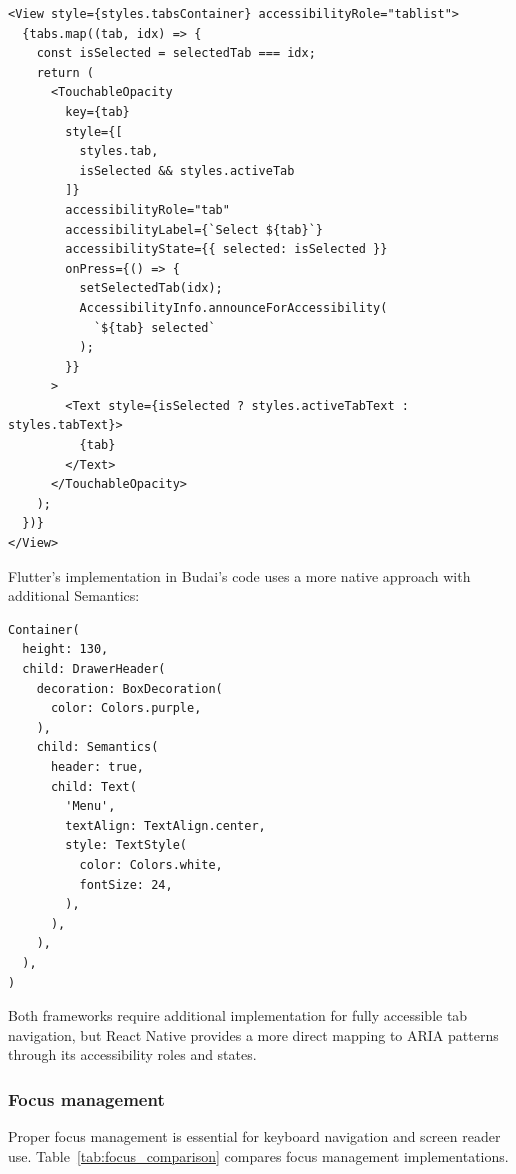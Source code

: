 \begin{lstlisting}[style=ReactNativeStyle, caption=React Native tab navigation implementation, label=lst:rn-tab]
<View style={styles.tabsContainer} accessibilityRole="tablist">
  {tabs.map((tab, idx) => {
    const isSelected = selectedTab === idx;
    return (
      <TouchableOpacity
        key={tab}
        style={[
          styles.tab,
          isSelected && styles.activeTab
        ]}
        accessibilityRole="tab"
        accessibilityLabel={`Select ${tab}`}
        accessibilityState={{ selected: isSelected }}
        onPress={() => {
          setSelectedTab(idx);
          AccessibilityInfo.announceForAccessibility(
            `${tab} selected`
          );
        }}
      >
        <Text style={isSelected ? styles.activeTabText : styles.tabText}>
          {tab}
        </Text>
      </TouchableOpacity>
    );
  })}
</View>
\end{lstlisting}

Flutter's implementation in Budai's code uses a more native approach with additional Semantics:

\begin{lstlisting}[style=DartStyle, caption=Flutter tab navigation implementation, label=lst:flutter-tab]
Container(
  height: 130,
  child: DrawerHeader(
    decoration: BoxDecoration(
      color: Colors.purple,
    ),
    child: Semantics(
      header: true,
      child: Text(
        'Menu',
        textAlign: TextAlign.center,
        style: TextStyle(
          color: Colors.white,
          fontSize: 24,
        ),
      ),
    ),
  ),
)
\end{lstlisting}

Both frameworks require additional implementation for fully accessible tab navigation, but React Native provides a more direct mapping to ARIA patterns through its accessibility roles and states.

\subsubsection{Focus management}
\label{subsubsec:focus-management}

Proper focus management is essential for keyboard navigation and screen reader use. Table~\ref{tab:focus_comparison} compares focus management implementations.

